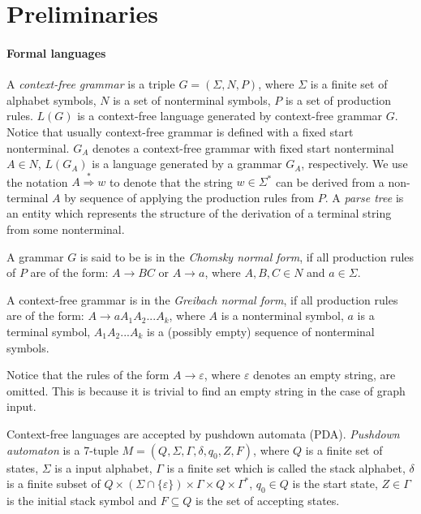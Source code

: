 \section{Preliminaries}
\label{sec:prel}
\label{preliminaries}
\paragraph{Formal languages} 
A \textit{context-free grammar} is a triple $G = (\Sigma, N, P)$, where $\Sigma$ is a finite set of alphabet symbols,  $N$ is a set of nonterminal symbols, $P$ is a set of production rules. $L(G)$ is a context-free language generated by context-free grammar $G$. Notice that usually context-free grammar is defined with a fixed start nonterminal. $G_A$ denotes a context-free grammar with fixed start nonterminal $A  \in N$, $L(G_A)$ is a language generated by a grammar $G_A$, respectively. We use the notation $A \stackrel {*}{\Rightarrow } w$  to denote that the string $w \in \Sigma^*$ can be derived from a non-terminal $A$ by sequence of applying the production rules from $P$. A \textit{parse tree} is an entity which represents the structure of the derivation of a terminal string from some nonterminal.


A grammar $G$ is said to be is in the \textit{Chomsky normal form}, if all production rules of $P$ are of the form:
$A \rightarrow BC$ or $A \rightarrow a$, where $A, B, C \in N$ and $a \in \Sigma$.


A context-free grammar is in the \textit{Greibach normal form}, if all production rules are of the form: $A \rightarrow aA_1A_2...A_k$, where $A$ is a nonterminal symbol, $a$ is a terminal symbol, $A_1A_2...A_k$ is a (possibly empty) sequence of nonterminal symbols.

Notice that the rules of the form $A \rightarrow \varepsilon$, where $\varepsilon$ denotes an empty string, are omitted. This is because it is trivial to find an empty string in the case of graph input. 


Context-free languages are accepted by pushdown automata (PDA). \textit{Pushdown automaton} is a 7-tuple $M = (Q, \Sigma, \Gamma, \delta, q_0, Z, F)$, where $Q$ is a finite set of states, $\Sigma$ is a input alphabet, $\Gamma$ is a finite set which is called the stack alphabet, $\delta$ is a finite subset of $Q \times (\Sigma \cap \{\varepsilon\}) \times \Gamma \times Q \times \Gamma^*$,
$q_{0}\in Q$ is the start state, $Z \in \Gamma$ is the initial stack symbol and
$F\subseteq Q$ is the set of accepting states.


